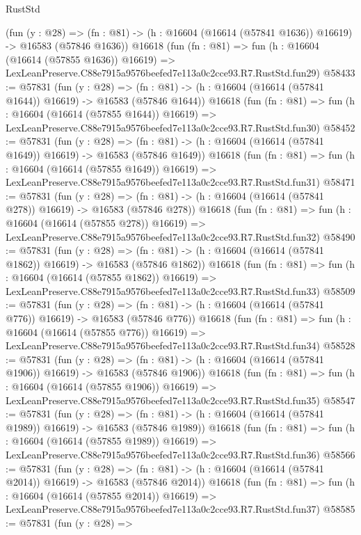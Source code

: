 \begin{lexlean}{RustStd}
\begin{coremodule}
    (fun (y : @28) =>
    (fn : @81) -> (h : @16604 (@16614 (@57841 @1636)) @16619) -> @16583 (@57846 @1636))
    @16618
    (fun (fn : @81) =>
    fun (h : @16604 (@16614 (@57855 @1636)) @16619) =>
    LexLeanPreserve.C88e7915a9576beefed7e113a0c2cce93.R7.RustStd.fun29)
@58433 := @57831
    (fun (y : @28) =>
    (fn : @81) -> (h : @16604 (@16614 (@57841 @1644)) @16619) -> @16583 (@57846 @1644))
    @16618
    (fun (fn : @81) =>
    fun (h : @16604 (@16614 (@57855 @1644)) @16619) =>
    LexLeanPreserve.C88e7915a9576beefed7e113a0c2cce93.R7.RustStd.fun30)
@58452 := @57831
    (fun (y : @28) =>
    (fn : @81) -> (h : @16604 (@16614 (@57841 @1649)) @16619) -> @16583 (@57846 @1649))
    @16618
    (fun (fn : @81) =>
    fun (h : @16604 (@16614 (@57855 @1649)) @16619) =>
    LexLeanPreserve.C88e7915a9576beefed7e113a0c2cce93.R7.RustStd.fun31)
@58471 := @57831
    (fun (y : @28) =>
    (fn : @81) -> (h : @16604 (@16614 (@57841 @278)) @16619) -> @16583 (@57846 @278))
    @16618
    (fun (fn : @81) =>
    fun (h : @16604 (@16614 (@57855 @278)) @16619) =>
    LexLeanPreserve.C88e7915a9576beefed7e113a0c2cce93.R7.RustStd.fun32)
@58490 := @57831
    (fun (y : @28) =>
    (fn : @81) -> (h : @16604 (@16614 (@57841 @1862)) @16619) -> @16583 (@57846 @1862))
    @16618
    (fun (fn : @81) =>
    fun (h : @16604 (@16614 (@57855 @1862)) @16619) =>
    LexLeanPreserve.C88e7915a9576beefed7e113a0c2cce93.R7.RustStd.fun33)
@58509 := @57831
    (fun (y : @28) =>
    (fn : @81) -> (h : @16604 (@16614 (@57841 @776)) @16619) -> @16583 (@57846 @776))
    @16618
    (fun (fn : @81) =>
    fun (h : @16604 (@16614 (@57855 @776)) @16619) =>
    LexLeanPreserve.C88e7915a9576beefed7e113a0c2cce93.R7.RustStd.fun34)
@58528 := @57831
    (fun (y : @28) =>
    (fn : @81) -> (h : @16604 (@16614 (@57841 @1906)) @16619) -> @16583 (@57846 @1906))
    @16618
    (fun (fn : @81) =>
    fun (h : @16604 (@16614 (@57855 @1906)) @16619) =>
    LexLeanPreserve.C88e7915a9576beefed7e113a0c2cce93.R7.RustStd.fun35)
@58547 := @57831
    (fun (y : @28) =>
    (fn : @81) -> (h : @16604 (@16614 (@57841 @1989)) @16619) -> @16583 (@57846 @1989))
    @16618
    (fun (fn : @81) =>
    fun (h : @16604 (@16614 (@57855 @1989)) @16619) =>
    LexLeanPreserve.C88e7915a9576beefed7e113a0c2cce93.R7.RustStd.fun36)
@58566 := @57831
    (fun (y : @28) =>
    (fn : @81) -> (h : @16604 (@16614 (@57841 @2014)) @16619) -> @16583 (@57846 @2014))
    @16618
    (fun (fn : @81) =>
    fun (h : @16604 (@16614 (@57855 @2014)) @16619) =>
    LexLeanPreserve.C88e7915a9576beefed7e113a0c2cce93.R7.RustStd.fun37)
@58585 := @57831
    (fun (y : @28) =>

\end{coremodule}
\end{lexlean}
